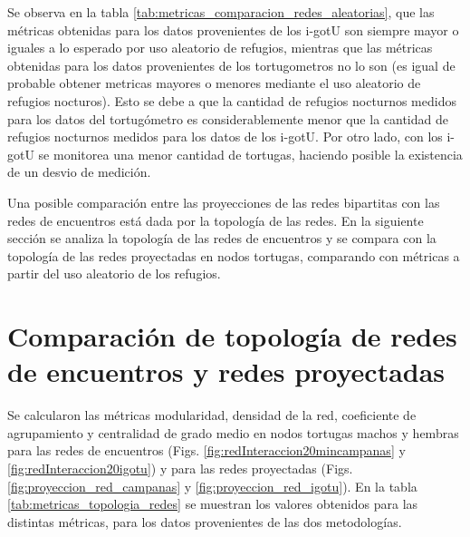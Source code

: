 Se observa en la tabla \ref{tab:metricas_comparacion_redes_aleatorias}, que las métricas obtenidas para los datos provenientes de los i-gotU son siempre mayor o iguales a lo esperado por uso aleatorio de refugios, mientras que las métricas obtenidas para los datos provenientes de los tortugometros no lo son (es igual de probable obtener metricas mayores o menores mediante el uso aleatorio de refugios nocturos). Esto se debe a que la cantidad de refugios nocturnos medidos para los datos del tortugómetro es considerablemente menor que la cantidad de refugios nocturnos medidos para los datos de los i-gotU. Por otro lado, con los i-gotU se monitorea una menor cantidad de tortugas, haciendo posible la existencia de un desvio de medición.
 
Una posible comparación entre las proyecciones de las redes bipartitas con las redes de encuentros está dada por la topología de las redes.  En la siguiente sección se analiza la topología de las redes de encuentros y se compara con la topología de las redes proyectadas en nodos tortugas, comparando con métricas a partir del uso aleatorio de los refugios.
\section{Comparación de topología de redes de encuentros y redes proyectadas}
Se calcularon las métricas modularidad, densidad de la red, coeficiente de agrupamiento y centralidad de grado medio en nodos tortugas machos y hembras para las redes de encuentros (Figs. \ref{fig:redInteraccion20mincampanas} y \ref{fig:redInteraccion20igotu}) y para las redes proyectadas (Figs. \ref{fig:proyeccion_red_campanas} y \ref{fig:proyeccion_red_igotu}). En la tabla \ref{tab:metricas_topologia_redes}   se muestran los valores obtenidos para las distintas métricas, para los datos provenientes de las dos metodologías.
 
 
 
